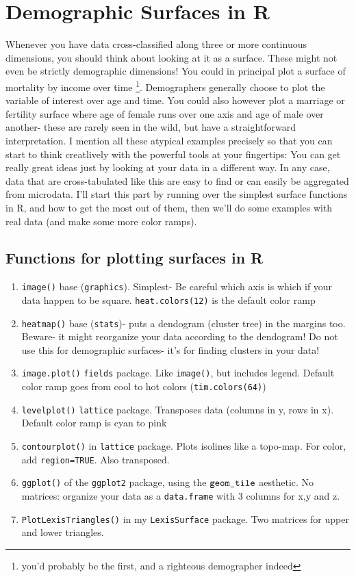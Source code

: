 \documentclass[a4paper]{article}
\begin{document}
\section{Demographic Surfaces in R}
Whenever you have data cross-classified along three or more continuous dimensions, you should think about looking at it as a surface. These might not even be strictly demographic dimensions! You could in principal plot a surface of mortality by income over time \footnote{you'd probably be the first, and a righteous demographer indeed}. Demographers generally choose to plot the variable of interest over age and time. You could also however plot a marriage or fertility surface where age of female runs over one axis and age of male over another- these are rarely seen in the wild, but have a straightforward interpretation. I mention all these atypical examples precisely so that you can start to think creatlively with the powerful tools at your fingertips: You can get really great ideas just by looking at your data in a different way. In any case, data that are cross-tabulated like this are easy to find or can easily be aggregated from microdata.  I'll start this part by running over the simplest surface functions in R, and how to get the most out of them, then we'll do some examples with real data (and make some more color ramps).

\subsection{Functions for plotting surfaces in R}

\begin{enumerate}
\item{\texttt{image()}} base (\texttt{graphics}). Simplest- Be careful which axis is which if your data happen to be square. \texttt{heat.colors(12)} is the default color ramp
\item{\texttt{heatmap()}} base (\texttt{stats})- puts a dendogram (cluster tree) in the margins too. Beware- it might reorganize your data according to the dendogram! Do not use this for demographic surfaces- it's for finding clusters in your data!
\item{\texttt{image.plot()}} \texttt{fields} package. Like \texttt{image()}, but includes legend. Default color ramp goes from cool to hot colors (\texttt{tim.colors(64)})
\item{\texttt{levelplot()}} \texttt{lattice} package. Transposes data (columns in y, rows in x). Default color ramp is cyan to pink
\item{\texttt{contourplot()}} in \texttt{lattice} package. Plots isolines like a topo-map. For color, add \texttt{region=TRUE}. Also transposed.
\item{\texttt{ggplot()}} of the \texttt{ggplot2} package, using the $\texttt{geom\textunderscore tile}$ aesthetic. No matrices: organize your data as a \texttt{data.frame} with 3 columns for x,y and z.
\item{\texttt{PlotLexisTriangles()}} in my \texttt{LexisSurface} package. Two matrices for upper and lower triangles.
\end{enumerate}
\end{document}
